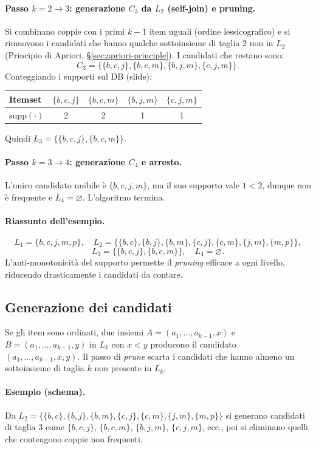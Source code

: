 \paragraph{Passo $k=2\to3$: generazione $C_3$ da $L_2$ (self-join) e pruning.}
Si combinano coppie con i primi $k-1$ item uguali (ordine lessicografico) e si rimuovono i candidati che hanno qualche sottoinsieme di taglia 2 non in $L_2$ (Principio di Apriori, \S\ref{sec:apriori-principle}). I candidati che restano sono:
\[
C_3=\{\{b,c,j\},\{b,c,m\},\{b,j,m\},\{c,j,m\}\}.
\]
Conteggiando i supporti sul DB (slide):
\begin{center}
\begin{tabular}{@{}lcccc@{}}
\toprule
Itemset & $\{b,c,j\}$ & $\{b,c,m\}$ & $\{b,j,m\}$ & $\{c,j,m\}$ \\
\midrule
$\mathrm{supp}(\cdot)$ & 2 & 2 & 1 & 1 \\
\bottomrule
\end{tabular}
\end{center}
Quindi $L_3=\{\{b,c,j\},\{b,c,m\}\}$.

\paragraph{Passo $k=3\to4$: generazione $C_4$ e arresto.}
L’unico candidato unibile è $\{b,c,j,m\}$, ma il suo supporto vale $1<2$, dunque non è frequente e $L_4=\varnothing$. L’algoritmo termina.

\paragraph{Riassunto dell’esempio.}
\[
L_1=\{b,c,j,m,p\},\quad
L_2=\{\{b,c\},\{b,j\},\{b,m\},\{c,j\},\{c,m\},\{j,m\},\{m,p\}\},
\]
\[
L_3=\{\{b,c,j\},\{b,c,m\}\},\quad
L_4=\varnothing.
\]
L’anti-monotonicità del supporto permette il \emph{pruning} efficace a ogni livello, riducendo drasticamente i candidati da contare. 


\subsection{Generazione dei candidati}\label{subsec:candidate-gen}
Se gli item sono ordinati, due insiemi $A=(a_1,\dots,a_{k-1},x)$ e $B=(a_1,\dots,a_{k-1},y)$ in $L_k$ con $x<y$ producono il candidato $(a_1,\dots,a_{k-1},x,y)$. Il passo di \emph{prune} scarta i candidati che hanno almeno un sottoinsieme di taglia $k$ non presente in $L_k$.

\paragraph{Esempio (schema).} Da $L_2=\{\{b,c\},\{b,j\},\{b,m\},\{c,j\},\{c,m\},\{j,m\},\{m,p\}\}$ si generano candidati di taglia 3 come $\{b,c,j\}$, $\{b,c,m\}$, $\{b,j,m\}$, $\{c,j,m\}$, ecc., poi si eliminano quelli che contengono coppie non frequenti.

